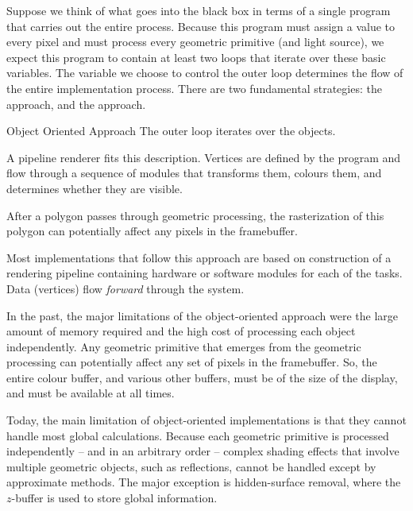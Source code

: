 \documentclass[../COS3712_Notes.tex]{subfiles}
\begin{document}
      Suppose we think of what goes into the black box in terms of a single program
      that carries out the entire process.
      Because this program must assign a value to every pixel and must process every
      geometric primitive (and light source),
      we expect this program to contain at least two loops that iterate over these basic
      variables.
      The variable we choose to control the outer loop determines the flow of the entire
      implementation process.
      There are two fundamental strategies: the  approach, and the
       approach.

      \begin{definition}{Object Oriented Approach}
        The outer loop iterates over the objects.

        A pipeline renderer fits this description.
        Vertices are defined by the program and flow through a sequence of modules that
        transforms them, colours them, and determines whether they are visible.

        After a polygon passes through geometric processing, the rasterization
        of this polygon can potentially affect any pixels in the framebuffer.

        Most implementations that follow this approach are based on construction of a
        rendering pipeline containing hardware or software modules for each of the tasks.
        Data (vertices) flow \emph{forward} through the system.

        In the past, the major limitations of the object-oriented approach were the
        large amount of memory required and the high cost of processing each object
        independently.
        Any geometric primitive that emerges from the geometric processing can potentially
        affect any set of pixels in the framebuffer.
        So, the entire colour buffer, and various other buffers, must be of the size of the
        display, and must be available at all times.

        Today, the main limitation of object-oriented implementations is that they cannot
        handle most global calculations.
        Because each geometric primitive is processed independently
        -- and in an arbitrary order --
        complex shading effects that involve multiple geometric objects,
        such as reflections,
        cannot be handled except by approximate methods.
        The major exception is hidden-surface removal, where the $z$-buffer is used to store
        global information.
      \end{definition}
\end{document}

